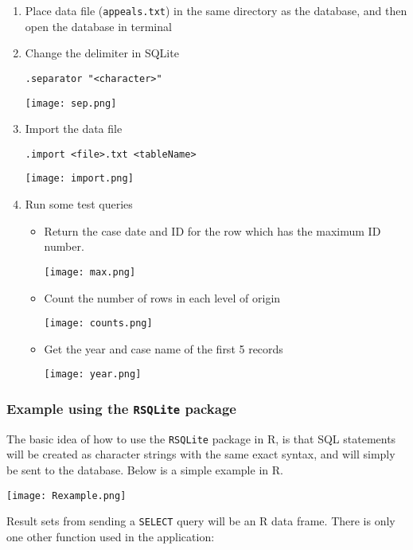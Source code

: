 \documentclass{article}
\begin{document}
\begin{enumerate}
\item Place data file ({\tt appeals.txt}) in the same directory as the database, and then open the database in terminal
\item Change the delimiter in SQLite
\begin{verbatim}
.separator "<character>"
\end{verbatim}
\begin{center}
\texttt{[image: sep.png]}
\end{center}

\item Import the data file
\begin{verbatim}
.import <file>.txt <tableName>
\end{verbatim}
\begin{center}
\texttt{[image: import.png]}
\end{center}

\item Run some test queries
\begin{itemize}
\item Return the case date and ID for the row which has the maximum ID number.
\begin{center}
\texttt{[image: max.png]}
\end{center}
\item Count the number of rows in each level of origin
\begin{center}
\texttt{[image: counts.png]}
\end{center}
\item Get the year and case name of the first 5 records
\begin{center}
\texttt{[image: year.png]}
\end{center}
\end{itemize}
\end{enumerate}

\subsubsection{Example using the {\tt RSQLite} package}
The basic idea of how to use the {\tt RSQLite} package in R, is that SQL statements will be created as character strings with the same exact syntax, and will simply be sent to the database. Below is a simple example in R. 
\begin{center}
\texttt{[image: Rexample.png]}
\end{center}
Result sets from sending a {\tt SELECT} query will be an R data frame. There is only one other function used in the application:
\end{document}
